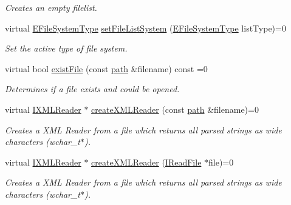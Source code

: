 \begin{DoxyCompactItemize}
\begin{DoxyCompactList}\small\item\em Creates an empty filelist. \end{DoxyCompactList}\item 
\mbox{\label{classirr_1_1io_1_1IFileSystem_a767614d727f0b1ec0bc5fdaaf906169b}} 
virtual \hyperlink{namespaceirr_1_1io_a22364f1caf06442a70f6198025af3fe9}{E\+File\+System\+Type} \hyperlink{classirr_1_1io_1_1IFileSystem_a767614d727f0b1ec0bc5fdaaf906169b}{set\+File\+List\+System} (\hyperlink{namespaceirr_1_1io_a22364f1caf06442a70f6198025af3fe9}{E\+File\+System\+Type} list\+Type)=0
\begin{DoxyCompactList}\small\item\em Set the active type of file system. \end{DoxyCompactList}\item 
virtual bool \hyperlink{classirr_1_1io_1_1IFileSystem_a1c5e98bc16e38b1d15b44e24b1b3bd32}{exist\+File} (const \hyperlink{namespaceirr_1_1io_a6468281622ce3a1c46b72e19f32dded5}{path} \&filename) const =0
\begin{DoxyCompactList}\small\item\em Determines if a file exists and could be opened. \end{DoxyCompactList}\item 
virtual \hyperlink{namespaceirr_1_1io_ab620b13630f0818f3eefc000f6917fe4}{I\+X\+M\+L\+Reader} $\ast$ \hyperlink{classirr_1_1io_1_1IFileSystem_a167c9fa159d16ee5c56c074636b0865e}{create\+X\+M\+L\+Reader} (const \hyperlink{namespaceirr_1_1io_a6468281622ce3a1c46b72e19f32dded5}{path} \&filename)=0
\begin{DoxyCompactList}\small\item\em Creates a X\+ML Reader from a file which returns all parsed strings as wide characters (wchar\+\_\+t$\ast$). \end{DoxyCompactList}\item 
virtual \hyperlink{namespaceirr_1_1io_ab620b13630f0818f3eefc000f6917fe4}{I\+X\+M\+L\+Reader} $\ast$ \hyperlink{classirr_1_1io_1_1IFileSystem_a38f4c90db3fd1b21473ce0cd2437bb59}{create\+X\+M\+L\+Reader} (\hyperlink{classirr_1_1io_1_1IReadFile}{I\+Read\+File} $\ast$file)=0
\begin{DoxyCompactList}\small\item\em Creates a X\+ML Reader from a file which returns all parsed strings as wide characters (wchar\+\_\+t$\ast$). \end{DoxyCompactList}\item 

\end{DoxyCompactItemize}
